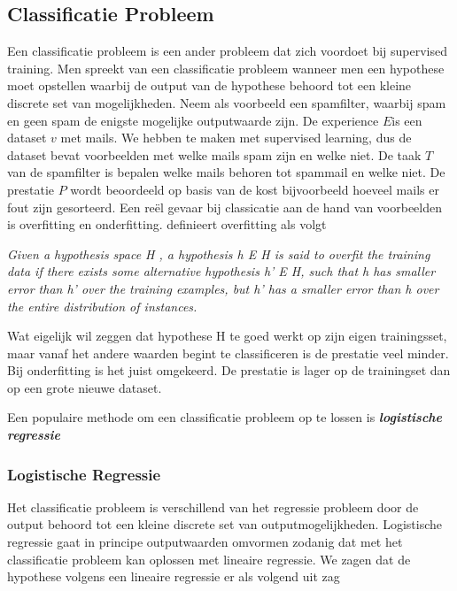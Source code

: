 \subsection{Classificatie Probleem}\label{Classificatie Probleem}

Een classificatie probleem is een ander probleem dat zich voordoet bij supervised training. Men spreekt van een classificatie probleem wanneer men een hypothese moet opstellen waarbij de output van de hypothese behoord tot een kleine discrete set van mogelijkheden. Neem als voorbeeld een spamfilter, waarbij spam en geen spam de enigste mogelijke outputwaarde zijn. De experience $E$is een dataset $v$ met mails. We hebben te maken met supervised learning, dus de dataset bevat voorbeelden met welke mails spam zijn en welke niet. De taak $T$ van de spamfilter is bepalen welke mails behoren tot spammail en welke niet. De prestatie $P$ wordt beoordeeld op basis van de kost bijvoorbeeld hoeveel mails er fout zijn gesorteerd.
\newline
Een re\"el gevaar bij classicatie aan de hand van voorbeelden is overfitting en onderfitting.
\cite{mitchell1997machine} definieert overfitting als volgt

\textit{Given a hypothesis space H , a hypothesis h E H is said to overfit the training data if there exists some alternative hypothesis h' E H, such that h has smaller error than h' over the training examples, but h' has a smaller error than h over the entire distribution of instances.}

Wat eigelijk wil zeggen dat hypothese H te goed werkt op zijn eigen trainingsset, maar vanaf het andere waarden begint te classificeren is de prestatie veel minder. Bij onderfitting is het juist omgekeerd. De prestatie is lager op de trainingset dan op een grote nieuwe dataset.

Een populaire methode om een classificatie probleem op te lossen is \textbf{\textit{logistische regressie}}

\subsubsection{Logistische Regressie}\label{Logistische Regressie}

Het classificatie probleem is verschillend van het regressie probleem door de output behoord tot een kleine discrete set van outputmogelijkheden. Logistische regressie gaat in principe outputwaarden omvormen zodanig dat met het classificatie probleem kan oplossen met lineaire regressie. We zagen dat de hypothese volgens een lineaire regressie er als volgend uit zag

